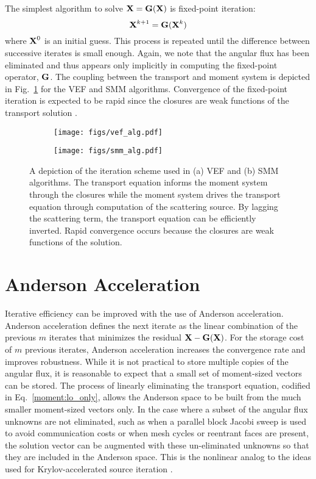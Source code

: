 \documentclass[../doc.tex]{subfiles}
\begin{document}
The simplest algorithm to solve $\boldsymbol{\mathrm{X}} = \boldsymbol{\mathrm{G}}(\boldsymbol{\mathrm{X}})$ is fixed-point iteration: 
	\begin{equation}
		\boldsymbol{\mathrm{X}}^{k+1} = \boldsymbol{\mathrm{G}}(\boldsymbol{\mathrm{X}}^k) 
	\end{equation}
where $\boldsymbol{\mathrm{X}}^0$ is an initial guess. This process is repeated until the difference between successive iterates is small enough. Again, we note that the angular flux has been eliminated and thus appears only implicitly in computing the fixed-point operator, $\boldsymbol{\mathrm{G}}$. The coupling between the transport and moment system is depicted in Fig.~\ref{moment:moment_alg} for the VEF and SMM algorithms. Convergence of the fixed-point iteration is expected to be rapid since the closures are weak functions of the transport solution \cite{goldin}. 
\begin{figure}
\centering
\begin{subfigure}{.47\textwidth}
	\centering
	\texttt{[image: figs/vef\_alg.pdf]}	
	\caption{}
\end{subfigure}
\hfill
\begin{subfigure}{.47\textwidth}
	\centering
	\texttt{[image: figs/smm\_alg.pdf]}	
	\caption{}
\end{subfigure}
\caption{A depiction of the iteration scheme used in (a) VEF and (b) SMM algorithms. The transport equation informs the moment system through the closures while the moment system drives the transport equation through computation of the scattering source. By lagging the scattering term, the transport equation can be efficiently inverted. Rapid convergence occurs because the closures are weak functions of the solution.}
\label{moment:moment_alg}
\end{figure}

\section{Anderson Acceleration}
Iterative efficiency can be improved with the use of Anderson acceleration. Anderson acceleration defines the next iterate as the linear combination of the previous $m$ iterates that minimizes the residual $\boldsymbol{\mathrm{X}} - \boldsymbol{\mathrm{G}}(\boldsymbol{\mathrm{X}})$. For the storage cost of $m$ previous iterates, Anderson acceleration increases the convergence rate and improves robustness. While it is not practical to store multiple copies of the angular flux, it is reasonable to expect that a small set of moment-sized vectors can be stored. The process of linearly eliminating the transport equation, codified in Eq.~\ref{moment:lo_only}, allows the Anderson space to be built from the much smaller moment-sized vectors only. In the case where a subset of the angular flux unknowns are not eliminated, such as when a parallel block Jacobi sweep is used to avoid communication costs or when mesh cycles or reentrant faces are present, the solution vector can be augmented with these un-eliminated unknowns so that they are included in the Anderson space. This is the nonlinear analog to the ideas used for Krylov-accelerated source iteration \cite{doi:10.13182/NSE02-14}. 
\end{document}
